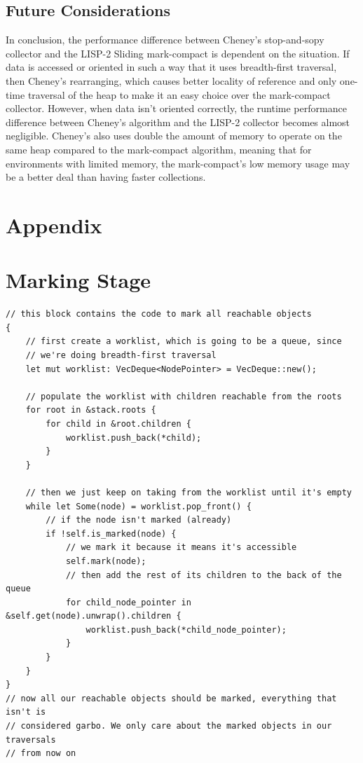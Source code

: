 \documentclass[index]{subfiles}
\begin{document}
\subsection{Future Considerations}

In conclusion, the performance difference between Cheney's stop-and-sopy collector and the LISP-2 Sliding mark-compact is dependent on the situation. If data is accessed or oriented in such a way that it uses breadth-first traversal, then Cheney's rearranging, which causes better locality of reference and only one-time traversal of the heap to make it an easy choice over the mark-compact collector. However, when data isn't oriented correctly, the runtime performance difference between Cheney's algorithm and the LISP-2 collector becomes almost negligible. Cheney's also uses double the amount of memory to operate on the same heap compared to the mark-compact algorithm, meaning that for environments with limited memory, the mark-compact's low memory usage may be a better deal than having faster collections.

\section{Appendix}

\appendix
\section{Marking Stage}
\begin{verbatim}
// this block contains the code to mark all reachable objects
{
    // first create a worklist, which is going to be a queue, since
    // we're doing breadth-first traversal
    let mut worklist: VecDeque<NodePointer> = VecDeque::new();

    // populate the worklist with children reachable from the roots
    for root in &stack.roots {
        for child in &root.children {
            worklist.push_back(*child);
        }
    }

    // then we just keep on taking from the worklist until it's empty
    while let Some(node) = worklist.pop_front() {
        // if the node isn't marked (already)
        if !self.is_marked(node) {
            // we mark it because it means it's accessible
            self.mark(node);
            // then add the rest of its children to the back of the queue
            for child_node_pointer in &self.get(node).unwrap().children {
                worklist.push_back(*child_node_pointer);
            }
        }
    }
}
// now all our reachable objects should be marked, everything that isn't is
// considered garbo. We only care about the marked objects in our traversals
// from now on
\end{verbatim}
\end{document}
